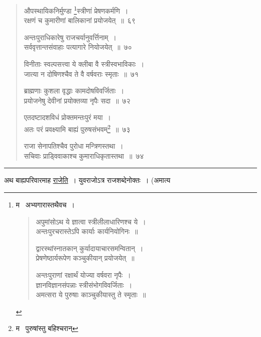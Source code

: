 \documentclass[11pt, openany]{book}
\begin{document}
\begin{quote}
{\na औपस्थायिकनिर्मुण्डा \renewcommand{\thefootnote}{1}\footnote{म \textendash\  अभ्यगारास्तथैवच~।

\begin{quote}
{\qt अपुमांसोऽथ ये ज्ञात्वा स्त्रीलीलाधारिणश्च ये~।\\
अन्तःपुरचरास्तेऽपि कार्याः कार्यनियोगिनः~॥

द्वारस्थांस्नातकान् कुर्यादायाचारसमन्वितान्~।\\
प्रेषणेष्ठार्यरूपेण कञ्चुकीयान् प्रयोजयेत्~॥

अन्तःपुराणां रक्षार्थं योज्या वर्षवरा नृपैः~।\\
ज्ञानविज्ञानसंपन्नाः स्त्रीसंभोगविवर्जिताः~।\\
अमत्सरा ये पुरुषाः काञ्चुकीयास्तु ते स्मृताः~॥}
\end{quote}}स्त्रीणां प्रेषणकर्मणि~।\\
रक्षणं च कुमारीणां बालिकानां प्रयोजयेत्~॥~६९

अन्तःपुराधिकारेषु राजचर्यानुवर्त्तिनाम्~।\\
सर्ववृत्तान्तसंवाहाः पत्यागारे नियोजयेत्~॥~७०

विनीताः स्वल्पसत्त्वा ये क्लीबा वै स्त्रीस्वभाविकाः~।\\
जात्या न दोषिणश्चैव ते वै वर्षवराः स्मृताः~॥~७१

ब्राह्मणाः कुशला वृद्धाः कामदोषविवर्जिताः~।\\
प्रयोजनेषु देवीनां प्रयोक्तव्या नृपैः सदा~॥~७२

एतदष्टादशविधं प्रोक्तमन्तःपुरं मया~।\\
अतः परं प्रवक्ष्यामि बाह्यं पुरुषसंभवम्\renewcommand{\thefootnote}{2}\footnote{म \textendash\  पुरुषांस्तु बहिश्चरान्}~॥~७३

राजा सेनापतिश्चैव पुरोधा मन्त्रिणस्तथा~।\\
सचिवाः प्राड्विवाकाश्च कुमाराधिकृतास्तथा~॥~७४}
\end{quote}

\hrule

\vspace{2mm}
\noindent
अथ बाह्यपरिवारमाह \underline{राजेति}~। युवराजोऽत्र राजशब्देनोक्तः~। (अमात्य\textendash

\newpage
\end{document}
